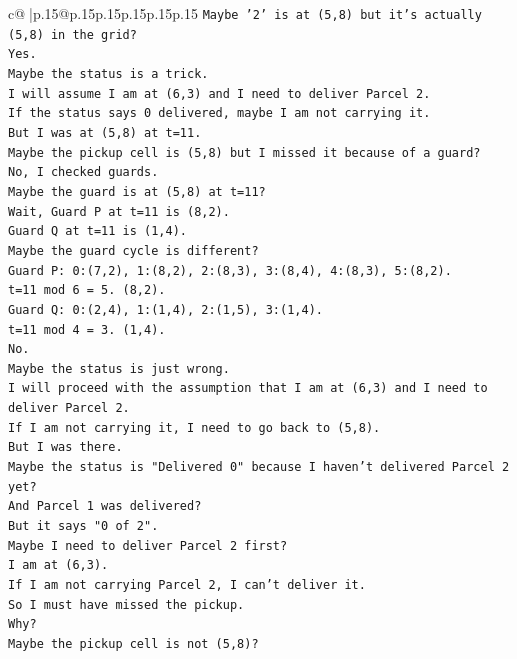 \documentclass{article}
\begin{document}
{\begin{supertabular}{c@{$\;$}|p{.15\linewidth}@{}p{.15\linewidth}p{.15\linewidth}p{.15\linewidth}p{.15\linewidth}p{.15\linewidth}}
{{{\texttt{Maybe '2' is at (5,8) but it's actually (5,8) in the grid?} \\
\texttt{Yes.} \\
\texttt{Maybe the status is a trick.} \\
\texttt{I will assume I am at (6,3) and I need to deliver Parcel 2.} \\
\texttt{If the status says 0 delivered, maybe I am not carrying it.} \\
\texttt{But I was at (5,8) at t=11.} \\
\texttt{Maybe the pickup cell is (5,8) but I missed it because of a guard?} \\
\texttt{No, I checked guards.} \\
\texttt{Maybe the guard is at (5,8) at t=11?} \\
\texttt{Wait, Guard P at t=11 is (8,2).} \\
\texttt{Guard Q at t=11 is (1,4).} \\
\texttt{Maybe the guard cycle is different?} \\
\texttt{Guard P: 0:(7,2), 1:(8,2), 2:(8,3), 3:(8,4), 4:(8,3), 5:(8,2).} \\
\texttt{t=11 mod 6 = 5. (8,2).} \\
\texttt{Guard Q: 0:(2,4), 1:(1,4), 2:(1,5), 3:(1,4).} \\
\texttt{t=11 mod 4 = 3. (1,4).} \\
\texttt{No.} \\
\texttt{Maybe the status is just wrong.} \\
\texttt{I will proceed with the assumption that I am at (6,3) and I need to deliver Parcel 2.} \\
\texttt{If I am not carrying it, I need to go back to (5,8).} \\
\texttt{But I was there.} \\
\texttt{Maybe the status is "Delivered 0" because I haven't delivered Parcel 2 yet?} \\
\texttt{And Parcel 1 was delivered?} \\
\texttt{But it says "0 of 2".} \\
\texttt{Maybe I need to deliver Parcel 2 first?} \\
\texttt{I am at (6,3).} \\
\texttt{If I am not carrying Parcel 2, I can't deliver it.} \\
\texttt{So I must have missed the pickup.} \\
\texttt{Why?} \\
\texttt{Maybe the pickup cell is not (5,8)?} \\
}}}
\end{supertabular}}
\end{document}
